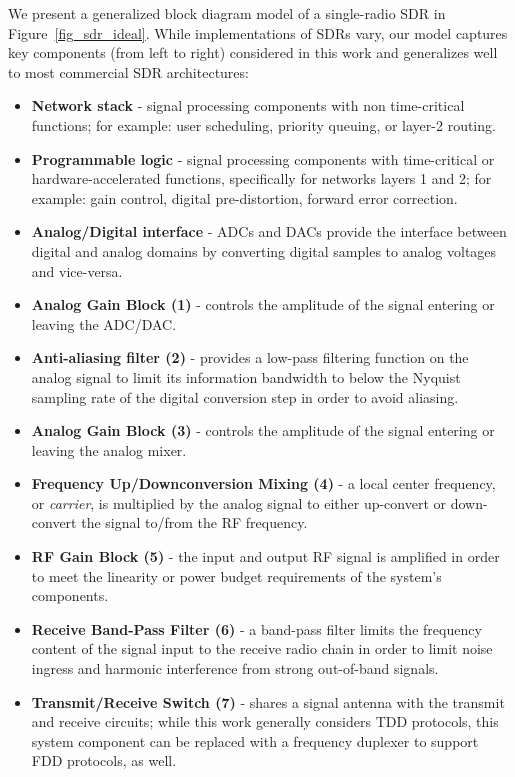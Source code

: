 We present a generalized block diagram model of a single-radio \ac{SDR} in Figure~\ref{fig_sdr_ideal}.
While implementations of \acp{SDR} vary, our model captures key components (from left to right) considered in this work and generalizes well to most commercial \ac{SDR} architectures:
\begin{itemize}
	\item \textbf{Network stack} - signal processing components with non time-critical functions; for example: user scheduling, priority queuing, or layer-2 routing.
	\item \textbf{Programmable logic} - signal processing components with time-critical or hardware-accelerated functions, specifically for networks layers 1 and 2; for example: gain control, digital pre-distortion, forward error correction.
	\item \textbf{Analog/Digital interface} - \acp{ADC} and \acp{DAC} provide the interface between digital and analog domains by converting digital samples to analog voltages and vice-versa.
	\item \textbf{Analog Gain Block (1)} - controls the amplitude of the signal entering or leaving the ADC/DAC.
	\item \textbf{Anti-aliasing filter (2)} - provides a low-pass filtering function on the analog signal to limit its information bandwidth to below the Nyquist sampling rate of the digital conversion step in order to avoid aliasing.
	\item \textbf{Analog Gain Block (3)} - controls the amplitude of the signal entering or leaving the analog mixer.
	\item \textbf{Frequency Up/Downconversion Mixing (4)} - a local center frequency, or \textit{carrier}, is multiplied by the analog signal to either up-convert or down-convert the signal to/from the RF frequency.
	\item \textbf{RF Gain Block (5)} - the input and output RF signal is amplified in order to meet the linearity or power budget requirements of the system's components.
	\item \textbf{Receive Band-Pass Filter (6)} - a band-pass filter limits the frequency content of the signal input to the receive radio chain in order to limit noise ingress and harmonic interference from strong out-of-band signals.
	\item \textbf{Transmit/Receive Switch (7)} - shares a signal antenna with the transmit and receive circuits; while this work generally considers \ac{TDD} protocols, this system component can be replaced with a frequency duplexer to support \ac{FDD} protocols, as well.
\end{itemize}

